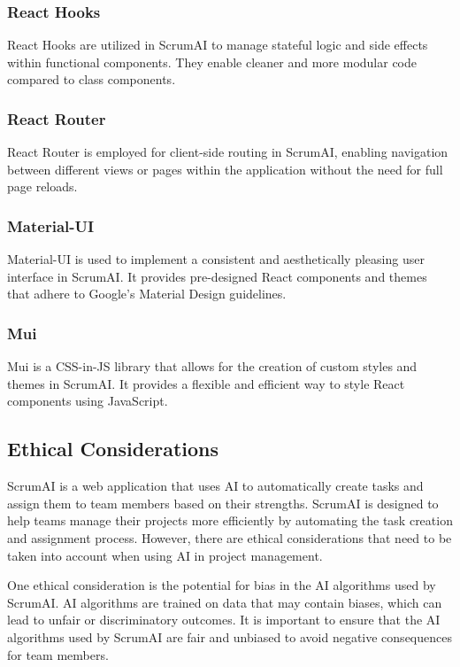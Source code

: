 \documentclass[conference]{IEEEtran}
\begin{document}
\subsubsection{React Hooks}
React Hooks are utilized in ScrumAI to manage stateful logic and side effects within functional components. They enable cleaner and more modular code compared to class components.

\subsubsection{React Router}
React Router is employed for client-side routing in ScrumAI, enabling navigation between different views or pages within the application without the need for full page reloads.

\subsubsection{Material-UI}
Material-UI is used to implement a consistent and aesthetically pleasing user interface in ScrumAI. It provides pre-designed React components and themes that adhere to Google's Material Design guidelines.

\subsubsection{Mui}
Mui is a CSS-in-JS library that allows for the creation of custom styles and themes in ScrumAI. It provides a flexible and efficient way to style React components using JavaScript.

\subsection{Ethical Considerations}
ScrumAI is a web application that uses AI to automatically create tasks and assign them to team members based on their strengths. ScrumAI is designed to help teams manage their projects more efficiently by automating the task creation and assignment process. However, there are ethical considerations that need to be taken into account when using AI in project management.

One ethical consideration is the potential for bias in the AI algorithms used by ScrumAI. AI algorithms are trained on data that may contain biases, which can lead to unfair or discriminatory outcomes. It is important to ensure that the AI algorithms used by ScrumAI are fair and unbiased to avoid negative consequences for team members.
\end{document}
